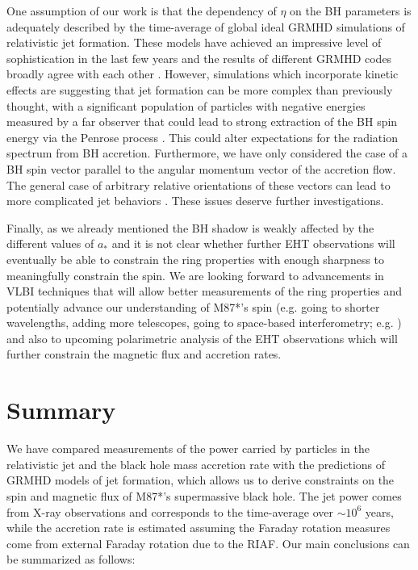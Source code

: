 \documentclass[twocolumn]{aastex62} %
\begin{document}
One assumption of our work is that the dependency of $\eta$ on the BH parameters is adequately described by the time-average of global ideal GRMHD simulations of relativistic jet formation. These models have achieved an impressive level of sophistication in the last few years and the results of different GRMHD codes broadly agree with each other . However, simulations which incorporate kinetic effects are suggesting that jet formation can be more complex than previously thought, with a significant population of  particles with negative energies measured by a far observer that could lead to strong extraction of the BH spin energy via the Penrose process \citep{Parfrey2019}. This could alter expectations for the radiation spectrum from BH accretion. Furthermore, we have only considered the case of a BH spin vector parallel to the angular momentum vector of the accretion flow. The general case of arbitrary relative orientations of these vectors can lead to more complicated jet behaviors \citep{Liska2018}. These issues deserve further investigations. 

Finally, as we already mentioned the BH shadow is weakly affected by the different values of $a_*$ and it is not clear whether further EHT observations will eventually be able to constrain the ring properties with enough sharpness to meaningfully constrain the spin. We are looking forward to advancements in VLBI techniques that will allow better measurements of the ring properties and  
potentially advance our understanding of M87*'s spin (e.g. going to shorter wavelengths, adding more telescopes, going to space-based interferometry; e.g. \citealt{Roelofs2019}) and also to upcoming polarimetric analysis of the EHT observations which will further constrain the magnetic flux and accretion rates.




\section{Summary}	\label{sec:summary}

We have compared measurements of the power carried by particles in the relativistic jet and the black hole mass accretion rate with the predictions of GRMHD models of jet formation, which allows us to derive constraints on the spin and magnetic flux of M87*'s supermassive black hole. The jet power comes from X-ray observations and corresponds to the time-average over $\sim 10^6$ years, while the accretion rate is estimated assuming the Faraday rotation measures come from external Faraday rotation due to the RIAF. Our main conclusions can be summarized as follows:
\end{document}
